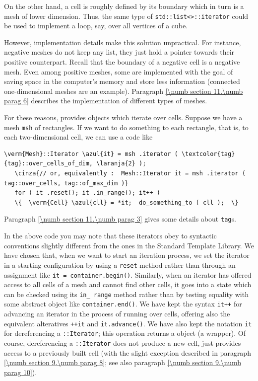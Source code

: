 On the other hand, a cell is roughly defined by its boundary which in turn is a mesh of
lower dimension.
Thus, the same type of {\small\tt std::list<>::iterator} could be used to
implement a loop, say, over all vertices of a cube.

However, implementation details make this solution unpractical.
For instance, negative meshes do not keep any list,
they just hold a pointer towards their positive counterpart.
Recall that the boundary of a negative cell is a negative mesh.
Even among positive meshes, some are implemented with the goal of saving space in the
computer's memory and store less information (connected one-dimensional meshes are an
example).
Paragraph \ref{\numb section 11.\numb parag 6} describes the implementation of different
types of meshes.

For these reasons, {\maniFEM} provides objects which iterate over cells.
Suppose we have a mesh {\small\tt msh} of rectangles.
If we want to do something to each rectangle, that is, to each two-dimensional cell,
we can use a code like

\begin{Verbatim}[commandchars=\\\{\},formatcom=\small\tt,
   baselinestretch=0.94,framesep=2mm                      ]
   \verm{Mesh}::Iterator \azul{it} = msh .iterator ( \textcolor{tag}{tag}::over_cells_of_dim, \laranja{2} );
   \cinza{// or, equivalently :  Mesh::Iterator it = msh .iterator ( tag::over_cells, tag::of_max_dim )}
   for ( it .reset(); it .in_range(); it++ )
   \{  \verm{Cell} \azul{cll} = *it;  do_something_to ( cll );  \}
\end{Verbatim}

Paragraph \ref{\numb section 11.\numb parag 3} gives some details about
{\small\tt\textcolor{tag}{tag}}s.

In the above code you may note that these iterators obey to syntactic conventions
slightly different from the ones in the Standard Template Library.
We have chosen that, when we want to start an iteration process, we set the iterator in
a starting configuration by using a {\small\tt reset} method rather than through an assignment
like {\small\tt it = container.begin()}.
Similarly, when an iterator has offered access to all cells of a mesh and cannot find
other cells, it goes into a state which can be checked using its {\small\tt in\_\,range} method
rather than by testing equality with some abstract object like {\small\tt container.end()}.
We have kept the syntax {\small\tt it++} for advancing an iterator in the process of
running over cells, offering also the equivalent alteratives {\small\tt ++it} and
{\small\tt it.advance()}.
We have also kept the notation {\small\tt *it} for dereferencing a
{\small\tt {}::Iterator};
this operation returns a {\small\tt {}} object (a wrapper).
Of course, dereferencing a {\small\tt {}::Iterator} does not produce a new cell,
just provides access to a previously built cell
(with the slight exception described in paragraph \ref{\numb section 9.\numb parag 8};
see also paragraph \ref{\numb section 9.\numb parag 10}).

